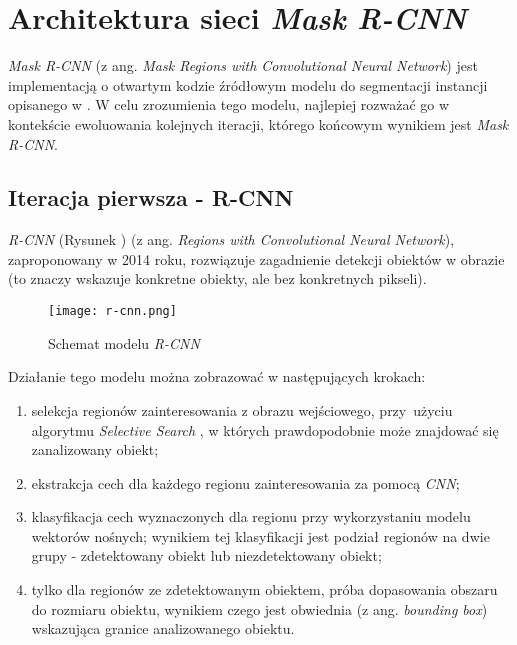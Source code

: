 \section{Architektura sieci \textit{Mask R-CNN}}
\label{sec:architekrura_mask_rcnn}

\textit{Mask R-CNN} \cite{matterport-mask-rcnn} (z ang. \textit{Mask Regions with Convolutional Neural Network}) jest implementacją o otwartym kodzie źródłowym modelu do segmentacji instancji opisanego w \cite{general-mask-rcnn}.
W celu zrozumienia tego modelu, najlepiej rozważać go w kontekście ewoluowania kolejnych iteracji, którego końcowym wynikiem jest \textit{Mask R-CNN}.

\subsection{Iteracja pierwsza - R-CNN}

\textit{R-CNN} \cite{rcnn} (Rysunek ) (z ang. \textit{Regions with Convolutional Neural Network}), zaproponowany w 2014 roku, rozwiązuje zagadnienie detekcji obiektów w obrazie (to znaczy wskazuje konkretne obiekty, ale bez konkretnych pikseli).

\begin{figure}[h]
  \centering
  \texttt{[image: r-cnn.png]}
  \caption{Schemat modelu \textit{R-CNN}}
  \label{fig:r_cnn}
\end{figure}

Działanie tego modelu można zobrazować w następujących krokach:
\label{sec:regiony}
\begin{enumerate}
  \item selekcja regionów zainteresowania z obrazu wejściowego, przy~użyciu algorytmu \textit{Selective Search} \cite{selective-search}, w których prawdopodobnie może znajdować się zanalizowany obiekt;
  \item ekstrakcja cech dla każdego regionu zainteresowania za pomocą \textit{CNN};
  \item klasyfikacja cech wyznaczonych dla regionu przy wykorzystaniu modelu wektorów nośnych; wynikiem tej klasyfikacji jest podział regionów na dwie grupy - zdetektowany obiekt lub niezdetektowany obiekt;
  \item tylko dla regionów ze zdetektowanym obiektem, próba dopasowania obszaru do rozmiaru obiektu, wynikiem czego jest obwiednia (z ang. \textit{bounding box}) wskazująca granice analizowanego obiektu.
\end{enumerate}

